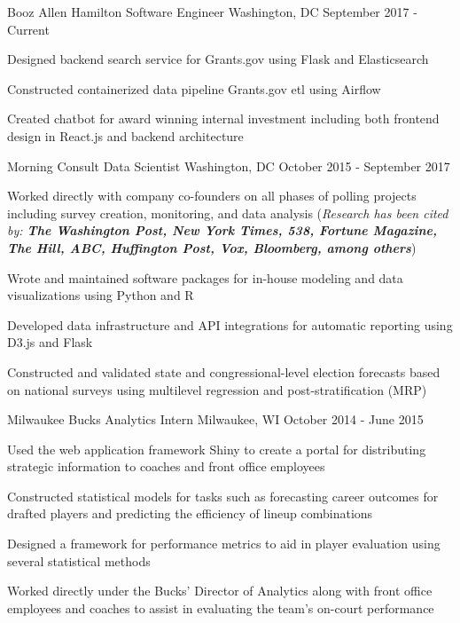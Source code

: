 \documentclass[11pt, a4paper]{awesome-cv}
\begin{document}
\begin{cventries}
  \cventry
    {Booz Allen Hamilton}
    {Software Engineer}
    {Washington, DC}
    {September 2017 - Current}
    {
      \begin{cvitems}
        \item{Designed backend search service for Grants.gov using Flask and Elasticsearch}
        \item{Constructed containerized data pipeline Grants.gov etl using Airflow}
        \item{Created chatbot for award winning internal investment including both frontend design in React.js and backend architecture}
      \end{cvitems}
    }
  \cventry
    {Morning Consult}
    {Data Scientist}
    {Washington, DC}
    {October 2015 - September 2017}
    {
      \begin{cvitems}
        \item{Worked directly with company co-founders on all phases of polling projects including survey creation,
        monitoring, and data analysis (\textit{Research has been cited by: \textbf{The Washington Post, New York Times, 538, Fortune Magazine, The Hill, ABC, Huffington Post, Vox, Bloomberg, among others}})}
        \item{Wrote and maintained software packages for in-house modeling and data visualizations using Python and R}
        \item{Developed data infrastructure and API integrations for automatic reporting using D3.js and Flask}
        \item{Constructed and validated state and congressional-level election forecasts based on national surveys using multilevel regression and post-stratification (MRP)}
      \end{cvitems}
    }
  \cventry
    {Milwaukee Bucks}
    {Analytics Intern}
    {Milwaukee, WI}
    {October 2014 - June 2015}
    {
      \begin{cvitems}
        \item{Used the web application framework Shiny to create a portal for distributing strategic information to coaches and front office employees}
        \item{Constructed statistical models for tasks such as forecasting career outcomes for drafted players
and predicting the efficiency of lineup combinations}
         \item{Designed a framework for performance metrics to aid in player evaluation using several statistical
methods}
        \item{Worked directly under the Bucks’ Director of Analytics along with front office employees and
coaches to assist in evaluating the team’s on-court performance}
      \end{cvitems}
    }

\end{cventries}
\end{document}

